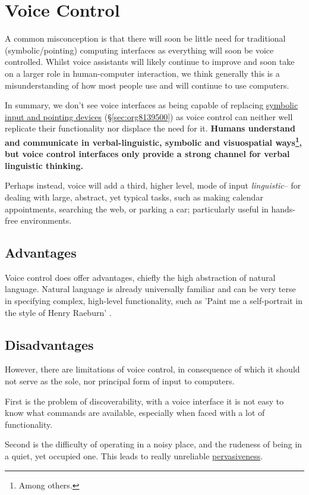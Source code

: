 \documentclass[logo,bsc,singlespacing,parskip]{infthesis}
\begin{document}
\section{Voice Control}
\label{sec:org456ac44}
A common misconception is that there will soon be little need for traditional (symbolic/pointing) computing interfaces as everything will soon be voice controlled.
Whilst voice assistants will likely continue to improve and soon take on a larger role in human-computer interaction, we think generally this is a misunderstanding of how most people use and will continue to use computers.

In summary, we don't see voice interfaces as being capable of replacing \hyperref[sec:org8139500]{symbolic input and pointing devices} (\S \ref{sec:org8139500}) as voice control can neither well replicate their functionality nor displace the need for it.
\textbf{Humans understand and communicate in verbal-linguistic, symbolic and visuospatial ways\footnote{Among others.}, but voice control interfaces only provide a strong channel for verbal linguistic thinking.}

Perhaps instead, voice will add a third, higher level, mode of input \emph{linguistic}-- for dealing with large, abstract, yet typical tasks, such as making calendar appointments, searching the web, or parking a car; particularly useful in hands-free environments.

\subsection{Advantages}
\label{sec:org7e62bbb}
Voice control does offer advantages, chiefly the high abstraction of natural language.
Natural language is already universally familiar and can be very terse in specifying complex, high-level functionality, such as 'Paint me a self-portrait in the style of Henry Raeburn' \autocite{DALLa}.

\subsection{Disadvantages}
\label{sec:org24ce85d}
However, there are limitations of voice control, in consequence of which it should not serve as the sole, nor principal form of input to computers.

First is the problem of discoverability, with a voice interface it is not easy to know what commands are available, especially when faced with a lot of functionality.

Second is the difficulty of operating in a noisy place, and the rudeness of being in a quiet, yet occupied one.
This leads to really unreliable \hyperref[pervasiveness]{pervasiveness}.
\end{document}
